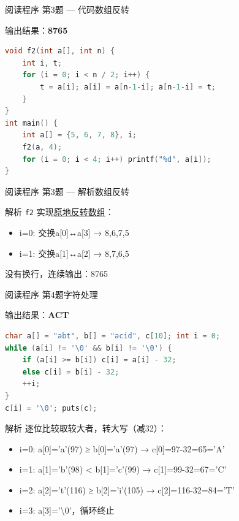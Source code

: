 \begin{frame}[fragile]{阅读程序 第3题 — 代码}{数组反转}
    \begin{exampleblock}{输出结果：\textbf{8765}}
    \end{exampleblock}
    \begin{lstlisting}[language=C]
void f2(int a[], int n) {
    int i, t;
    for (i = 0; i < n / 2; i++) {
        t = a[i]; a[i] = a[n-1-i]; a[n-1-i] = t;
    }
}
int main() {
    int a[] = {5, 6, 7, 8}, i;
    f2(a, 4);
    for (i = 0; i < 4; i++) printf("%d", a[i]);
}
\end{lstlisting}
\end{frame}

\begin{frame}[fragile]{阅读程序 第3题 — 解析}{数组反转}
    \begin{alertblock}{解析}
        \footnotesize \texttt{f2} 实现\underline{原地反转数组}：
        \begin{itemize}
            \setlength{\itemsep}{0pt}
            \item i=0: 交换a[0]↔a[3] → {8,6,7,5}
            \item i=1: 交换a[1]↔a[2] → {8,7,6,5}
        \end{itemize}
        没有换行，连续输出：8765
    \end{alertblock}
\end{frame}

\begin{frame}[fragile]{阅读程序 第4题}{字符处理}
    \begin{exampleblock}{输出结果：\textbf{ACT}}
    \end{exampleblock}
    \begin{lstlisting}[language=C,basicstyle=\scriptsize\ttfamily]
char a[] = "abt", b[] = "acid", c[10]; int i = 0;
while (a[i] != '\0' && b[i] != '\0') {
    if (a[i] >= b[i]) c[i] = a[i] - 32;
    else c[i] = b[i] - 32;
    ++i;
}
c[i] = '\0'; puts(c);
\end{lstlisting}
    \pause
    \begin{alertblock}{解析}
        \footnotesize 逐位比较取较大者，转大写（减32）：
        \begin{itemize}
            \setlength{\itemsep}{0pt}
            \item i=0: a[0]='a'(97) ≥ b[0]='a'(97) → c[0]=97-32=65='A'
            \item i=1: a[1]='b'(98) < b[1]='c'(99) → c[1]=99-32=67='C'
            \item i=2: a[2]='t'(116) ≥ b[2]='i'(105) → c[2]=116-32=84='T'
            \item i=3: a[3]='\textbackslash 0'，循环终止
        \end{itemize}
    \end{alertblock}
\end{frame}

